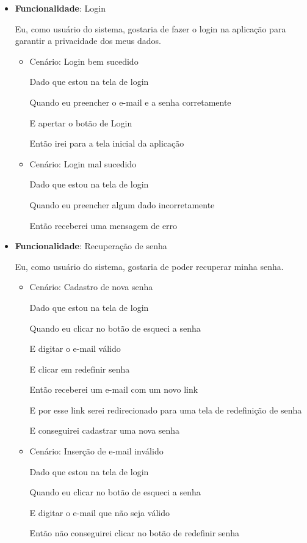 \begin{itemize}
\item\textbf{Funcionalidade}: Login
    
    Eu, como usuário do sistema, gostaria de fazer o login na aplicação para garantir a privacidade dos meus dados.
    \begin{itemize}
        \item Cenário: Login bem sucedido  
        \par Dado que estou na tela de login
        \par Quando eu preencher o e-mail e a senha corretamente
        \par E apertar o botão de Login
        \par Então irei para a tela inicial da aplicação
    \end{itemize}   
    \begin{itemize}
        \item Cenário: Login mal sucedido  
        \par Dado que estou na tela de login
        \par Quando eu preencher algum dado incorretamente
        \par Então receberei uma mensagem de erro
    \end{itemize}    

\item\textbf{Funcionalidade}: Recuperação de senha
    
    Eu, como usuário do sistema, gostaria de poder recuperar minha senha.
    \begin{itemize}
        \item Cenário: Cadastro de nova senha
        \par Dado que estou na tela de login
        \par Quando eu clicar no botão de esqueci a senha
        \par E digitar o e-mail válido
        \par E clicar em redefinir senha
        \par Então receberei um e-mail com um novo \gls{link} 
        \par E por esse \gls{link} serei redirecionado para uma tela de redefinição de senha
        \par E conseguirei cadastrar uma nova senha
    \end{itemize}    
    \begin{itemize}
        \item Cenário: Inserção de e-mail inválido
        \par Dado que estou na tela de login
        \par Quando eu clicar no botão de esqueci a senha
        \par E digitar o e-mail que não seja válido
        \par Então não conseguirei clicar no botão de redefinir senha
    \end{itemize}    


\end{itemize}
